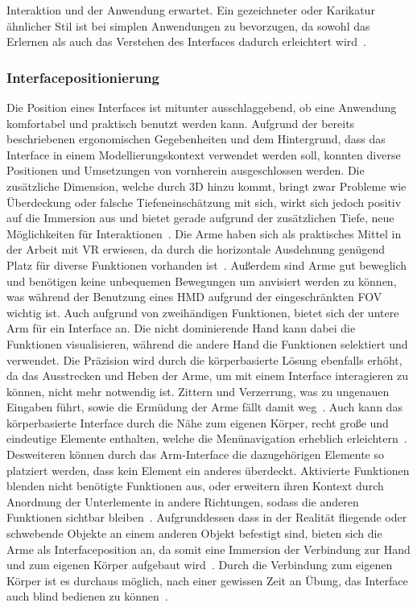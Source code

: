 Interaktion und der Anwendung erwartet. Ein gezeichneter oder Karikatur ähnlicher Stil ist bei simplen Anwendungen zu bevorzugen, da sowohl das Erlernen als auch das Verstehen des Interfaces dadurch erleichtert wird~\cite{theoryandpracticebook}.

\subsubsection{Interfacepositionierung}
Die Position eines Interfaces ist mitunter ausschlaggebend, ob eine Anwendung komfortabel und praktisch benutzt werden kann. Aufgrund der be\-reits beschriebenen ergonomischen Gegebenheiten und dem Hintergrund, dass das Interface in einem Modellierungskontext verwendet werden soll, konn\-ten diverse Positionen und Umsetzungen von vornherein ausgeschlossen werden. Die zusätzliche Dimension, welche durch 3D hinzu kommt, bringt zwar Probleme wie Überdeckung oder falsche Tiefeneinschätzung mit sich, wirkt sich jedoch positiv auf die Immersion aus und bietet gerade aufgrund der zusätzlichen Tiefe, neue Möglichkeiten für Interaktionen~\cite{constraints3duis}. Die Arme haben sich als praktisches Mittel in der Arbeit mit VR erwiesen, da durch die horizontale Ausdehnung genügend Platz für diverse Funktionen vorhanden ist~\cite{skinput}. Außerdem sind Arme gut beweglich und benötigen keine unbequemen Bewegungen um anvisiert werden zu können, was während der Benutzung eines HMD aufgrund der eingeschränkten FOV wichtig ist. Auch aufgrund von zweihändigen Funktionen, bietet sich der untere Arm für ein Interface an. Die nicht dominierende Hand kann dabei die Funktionen visualisieren, während die andere Hand die Funktionen selektiert und verwendet. Die Präzision wird durch die körperbasierte Lösung ebenfalls erhöht, da das Ausstrecken und Heben der Arme, um mit einem Interface interagieren zu können, nicht mehr notwendig ist. Zittern und Verzerrung, was zu ungenauen Eingaben führt, sowie die Ermüdung der Arme fällt damit weg~\cite{theoryandpracticebook,anintroductionto3dspacial,consumedindurance}. Auch kann das körperbasierte Interface durch die Nähe zum eigenen Körper, recht große und eindeutige Elemente enthalten, welche die Menünavigation erheblich erleichtern~\cite{constraints3duis}. Desweiteren können durch das Arm-Interface die dazugehörigen Elemente so platziert werden, dass kein Element ein anderes überdeckt. Aktivierte Funktionen blenden nicht benötigte Funktionen aus, oder erweitern ihren Kontext durch Anordnung der Unterlemente in andere Richtungen, sodass die anderen Funktionen sichtbar bleiben~\cite{implicationsoflocation}.
Aufgrunddessen dass in der Rea\-lität fliegende oder schwebende Objekte an einem anderen Objekt befestigt sind, bieten sich die Arme als Interfaceposition an, da somit eine Immersion der Verbindung zur Hand und zum eigenen Körper aufgebaut wird~\cite{constraints3duis}.
Durch die Verbindung zum eigenen Körper ist es durchaus möglich, nach einer gewissen Zeit an Übung, das Interface auch blind bedienen zu können~\cite{theoryandpracticebook}.

